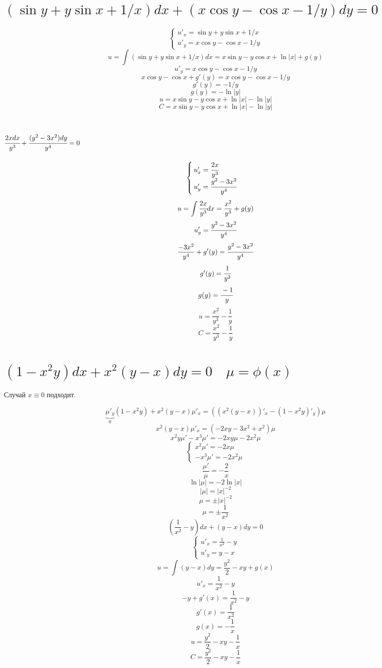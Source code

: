 

\cfoot{}




\section{$(\sin y +y\sin x+1/x)dx+(x\cos y-\cos x-1/y)dy=0$}

\[\begin{cases}
        u'_x = \sin y +y\sin x+1/x \\
        u'_y = x\cos y-\cos x-1/y
    \end{cases}\]
\[u = \int (\sin y +y\sin x+1/x) dx = x\sin y - y\cos x + \ln |x| + g(y)\]
\[u'_y = x\cos y-\cos x-1/y\]
\[x\cos y - \cos x + g'(y) = x\cos y-\cos x-1/y\]
\[g'(y) = -1/y\]
\[g(y) = -\ln |y|\]
\[u = x\sin y - y\cos x + \ln |x| - \ln |y|\]
\[C = x\sin y - y\cos x + \ln |x| - \ln |y|\]

\section{$\cfrac{2xdx}{y^3}+\cfrac{(y^2-3x^2)dy}{y^4}=0$}

\[\begin{cases}
        u'_x = \cfrac{2x}{y^3} \\
        u'_y = \cfrac{y^2-3x^2}{y^4}
    \end{cases}\]
\[u = \int \cfrac{2x}{y^3} dx = \frac{x^2}{y^3} + g(y)\]
\[u'_y = \cfrac{y^2-3x^2}{y^4}\]
\[\frac{-3x^2}{y^4} + g'(y) = \cfrac{y^2-3x^2}{y^4}\]
\[g'(y) = \cfrac{1}{y^2}\]
\[g(y) = \cfrac{-1}{y}\]
\[u = \frac{x^2}{y^3} - \frac{1}{y}\]
\[C = \frac{x^2}{y^3} - \frac{1}{y}\]

\section{$(1-x^2y)dx+x^2(y-x)dy=0 \quad \mu=\phi(x)$}

Случай $x\equiv0$ подходит.

\[\underbrace{\mu'_y}_{0} (1-x^2y) + x^2(y-x) \mu'_x = ((x^2(y-x))'_x - (1-x^2y)'_y)\mu\]
\[x^2(y-x) \mu'_x = (-2xy - 3x^2 + x^2)\mu\]
\[x^2y\mu' - x^3\mu' = -2xy\mu - 2x^2\mu\]
\[\begin{cases}
        x^2\mu' = -2x\mu \\
        -x^3\mu' = -2x^2\mu
    \end{cases}\]
\[\frac{\mu'}{\mu} = -\frac{2}{x}\]
\[\ln |\mu| = -2\ln|x|\]
\[|\mu| = |x|^{-2}\]
\[\mu = \pm|x|^{-2}\]
\[\mu = \pm\frac{1}{x^2}\]
\[\left(\frac{1}{x^2}-y\right)dx+(y-x)dy=0\]
\[\begin{cases}
        u'_x = \frac{1}{x^2}-y \\
        u'_y = y-x
    \end{cases}\]
\[u = \int (y-x)dy = \frac{y^2}{2} - xy + g(x)\]
\[u'_x = \frac{1}{x^2}-y\]
\[-y + g'(x) = \frac{1}{x^2}-y\]
\[g'(x) = \frac{1}{x^2}\]
\[g(x) = -\frac{1}{x}\]
\[u = \frac{y^2}{2} - xy - \frac{1}{x}\]
\[C = \frac{y^2}{2} - xy - \frac{1}{x}\]

